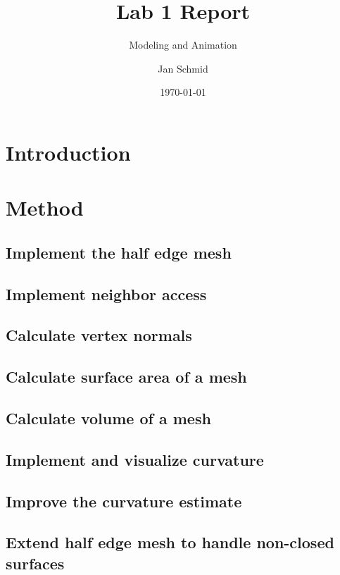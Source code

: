 \documentclass[12pt]{scrartcl}
\begin{document}
\title{Lab 1 Report}
\subtitle{Modeling and Animation}
\date{\today}
\author{Jan Schmid}

\maketitle 



\section{Introduction}

\section{Method}

\subsection{Implement the half edge mesh}

\subsection{Implement neighbor access}

\subsection{Calculate vertex normals}

\subsection{Calculate surface area of a mesh}

\subsection{Calculate volume of a mesh}

\subsection{Implement and visualize curvature}

\subsection{Improve the curvature estimate}

\subsection{Extend half edge mesh to handle non-closed surfaces}
\end{document}

